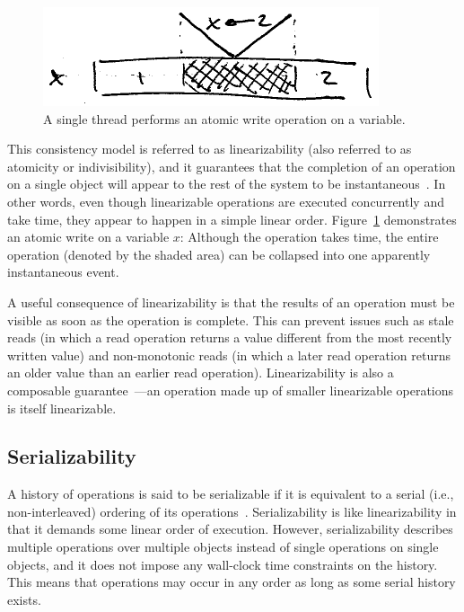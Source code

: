 \documentclass{sig-alternate}
\begin{document}
\begin{figure}[h]
  \centering
  \includegraphics{linearizability}
  \caption{A single thread performs an atomic write operation on a variable.}
\label{figure:linearizability}
\end{figure}

This consistency model is referred to as linearizability (also referred to as atomicity or indivisibility), and it guarantees that the completion of an operation on a single object will appear to the rest of the system to be instantaneous~\cite{Herlihy1990}. In other words, even though linearizable operations are executed concurrently and take time, they appear to happen in a simple linear order. Figure~\ref{figure:linearizability} demonstrates an atomic write on a variable $x$: Although the operation takes time, the entire operation (denoted by the shaded area) can be collapsed into one apparently instantaneous event.

A useful consequence of linearizability is that the results of an operation must be visible as soon as the operation is complete. This can prevent issues such as stale reads (in which a read operation returns a value different from the most recently written value) and non-monotonic reads (in which a later read operation returns an older value than an earlier read operation). Linearizability is also a composable guarantee~\cite{Herlihy1990}---an operation made up of smaller linearizable operations is itself linearizable.

\subsection{Serializability}

A history of operations is said to be serializable if it is equivalent to a serial (i.e., non-interleaved) ordering of its operations~\cite{Herlihy1990}. Serializability is like linearizability in that it demands some linear order of execution. However, serializability describes multiple operations over multiple objects instead of single operations on single objects, and it does not impose any wall-clock time constraints on the history. This means that operations may occur in any order as long as some serial history exists.
\end{document}
